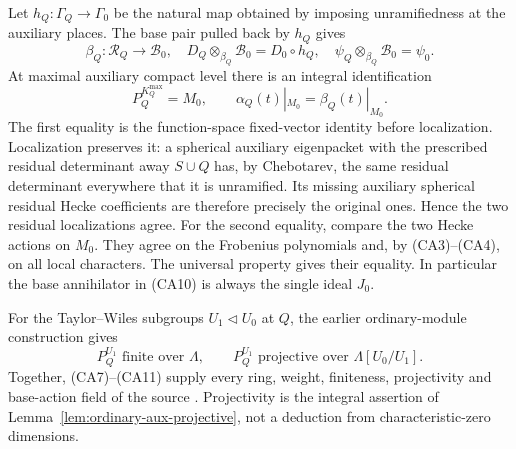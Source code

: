 Let \(h_Q:\Gamma_Q\to\Gamma_0\) be the natural map obtained
by imposing unramifiedness at the auxiliary places.
The base pair pulled back by \(h_Q\) gives
\[
 \beta_Q:\mathcal R_Q\longrightarrow\mathcal B_0,
 \quad
 D_Q\otimes_{\beta_Q}\mathcal B_0=D_0\circ h_Q,\quad
 \psi_Q\otimes_{\beta_Q}\mathcal B_0=\psi_0 .              \tag{CA9}
\]
At maximal auxiliary compact level there is an integral
identification
\[
 P_Q^{K_Q^{\max}}=M_0,\qquad
 \alpha_Q(t)|_{M_0}=\beta_Q(t)|_{M_0}.                    \tag{CA10}
\]
The first equality is the function-space fixed-vector
identity before localization. Localization preserves it:
a spherical auxiliary eigenpacket with the prescribed
residual determinant away \(S\cup Q\) has, by Chebotarev,
the same residual determinant everywhere that it is
unramified. Its missing auxiliary spherical residual
Hecke coefficients are therefore precisely the original
ones. Hence the two residual localizations agree.
For the second equality, compare the two Hecke actions on
\(M_0\). They agree on the Frobenius polynomials and,
by (CA3)--(CA4), on all local characters. The universal
property gives their equality. In particular the base
annihilator in (CA10) is always the single ideal \(J_0\).

For the Taylor--Wiles subgroups \(U_1\triangleleft U_0\)
at \(Q\), the earlier ordinary-module construction gives
\[
 P_Q^{U_1}\text{ finite over }\Lambda,\qquad
 P_Q^{U_1}\text{ projective over }\Lambda[U_0/U_1].
                                                               \tag{CA11}
\]
Together, (CA7)--(CA11) supply every ring, weight, finiteness,
projectivity and base-action field of the source
. Projectivity is the integral assertion
of Lemma~\ref{lem:ordinary-aux-projective}, not a deduction
from characteristic-zero dimensions.

